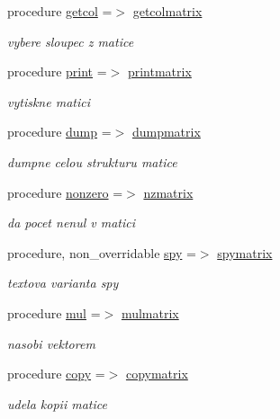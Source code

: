 \begin{DoxyCompactItemize}
procedure \hyperlink{structmtx_1_1matrix_af9d60c003f797c73085241d8c38ea792}{getcol} =$>$ \hyperlink{classmtx_abb68e8d5a8216a50b88e5c577b5ad403}{getcolmatrix}
\begin{DoxyCompactList}\small\item\em vybere sloupec z matice \end{DoxyCompactList}\item 
procedure \hyperlink{structmtx_1_1matrix_a4b7b05cc668bbeffed54335122063a03}{print} =$>$ \hyperlink{classmtx_a9b242fed3892da977edee5be16d85bdf}{printmatrix}
\begin{DoxyCompactList}\small\item\em vytiskne matici \end{DoxyCompactList}\item 
procedure \hyperlink{structmtx_1_1matrix_a1eacf25c7fa77ff8766a1ab281f50f19}{dump} =$>$ \hyperlink{classmtx_ae8163b304193b3e31cc36e31113ec9e9}{dumpmatrix}
\begin{DoxyCompactList}\small\item\em dumpne celou strukturu matice \end{DoxyCompactList}\item 
procedure \hyperlink{structmtx_1_1matrix_a085ae99f3dbc3a44fc4eba9471827fd9}{nonzero} =$>$ \hyperlink{classmtx_aac2e9af9cc01d6d2e4c305eb6ba95b7c}{nzmatrix}
\begin{DoxyCompactList}\small\item\em da pocet nenul v matici \end{DoxyCompactList}\item 
procedure, non\-\_\-overridable \hyperlink{structmtx_1_1matrix_a244598586f2b4d2de61eb827c6349485}{spy} =$>$ \hyperlink{classmtx_afba151bbf31e292a36f36279c0d74cf2}{spymatrix}
\begin{DoxyCompactList}\small\item\em textova varianta spy \end{DoxyCompactList}\item 
procedure \hyperlink{structmtx_1_1matrix_acb57be54454a5c1fad3429d8fab32b95}{mul} =$>$ \hyperlink{classmtx_a33216e985c0e2ec6536c2f013f8562ac}{mulmatrix}
\begin{DoxyCompactList}\small\item\em nasobi vektorem \end{DoxyCompactList}\item 
procedure \hyperlink{structmtx_1_1matrix_a54be9493d99d3be7246d31d46e21fd72}{copy} =$>$ \hyperlink{classmtx_add2b7c4a3a806aebca088907544db1e0}{copymatrix}
\begin{DoxyCompactList}\small\item\em udela kopii matice \end{DoxyCompactList}\end{DoxyCompactItemize}
